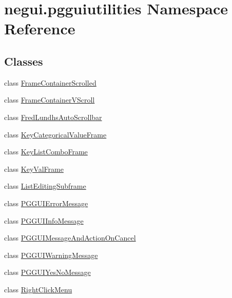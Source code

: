 \hypertarget{namespacenegui_1_1pgguiutilities}{}\section{negui.\+pgguiutilities Namespace Reference}
\label{namespacenegui_1_1pgguiutilities}
\subsection*{Classes}
\begin{DoxyCompactItemize}
\item 
class \hyperlink{classnegui_1_1pgguiutilities_1_1FrameContainerScrolled}{Frame\+Container\+Scrolled}
\item 
class \hyperlink{classnegui_1_1pgguiutilities_1_1FrameContainerVScroll}{Frame\+Container\+V\+Scroll}
\item 
class \hyperlink{classnegui_1_1pgguiutilities_1_1FredLundhsAutoScrollbar}{Fred\+Lundhs\+Auto\+Scrollbar}
\item 
class \hyperlink{classnegui_1_1pgguiutilities_1_1KeyCategoricalValueFrame}{Key\+Categorical\+Value\+Frame}
\item 
class \hyperlink{classnegui_1_1pgguiutilities_1_1KeyListComboFrame}{Key\+List\+Combo\+Frame}
\item 
class \hyperlink{classnegui_1_1pgguiutilities_1_1KeyValFrame}{Key\+Val\+Frame}
\item 
class \hyperlink{classnegui_1_1pgguiutilities_1_1ListEditingSubframe}{List\+Editing\+Subframe}
\item 
class \hyperlink{classnegui_1_1pgguiutilities_1_1PGGUIErrorMessage}{P\+G\+G\+U\+I\+Error\+Message}
\item 
class \hyperlink{classnegui_1_1pgguiutilities_1_1PGGUIInfoMessage}{P\+G\+G\+U\+I\+Info\+Message}
\item 
class \hyperlink{classnegui_1_1pgguiutilities_1_1PGGUIMessageAndActionOnCancel}{P\+G\+G\+U\+I\+Message\+And\+Action\+On\+Cancel}
\item 
class \hyperlink{classnegui_1_1pgguiutilities_1_1PGGUIWarningMessage}{P\+G\+G\+U\+I\+Warning\+Message}
\item 
class \hyperlink{classnegui_1_1pgguiutilities_1_1PGGUIYesNoMessage}{P\+G\+G\+U\+I\+Yes\+No\+Message}
\item 
class \hyperlink{classnegui_1_1pgguiutilities_1_1RightClickMenu}{Right\+Click\+Menu}
\end{DoxyCompactItemize}
